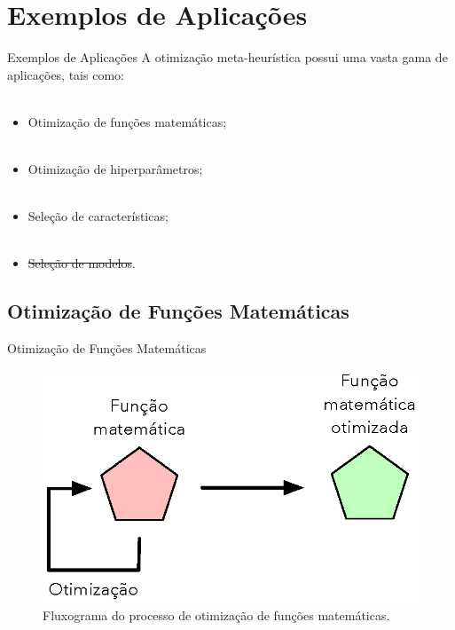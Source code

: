 \section{Exemplos de Aplicações}
\label{s.applications}

\begin{frame}{Exemplos de Aplicações}
	A otimização meta-heurística possui uma vasta gama de aplicações, tais como:
	\\~\\
	\begin{itemize}
		\justifying
		\item Otimização de funções matemáticas;
		\\~\\
		\item Otimização de hiperparâmetros;
		\\~\\
		\item Seleção de características;
		\\~\\
		\item \sout{Seleção de modelos}.
	\end{itemize}

\end{frame}

\subsection{Otimização de Funções Matemáticas}
\label{ss.applications_benchmark}

\begin{frame}{Otimização de Funções Matemáticas}
	\begin{figure}
		\centering
		\includegraphics[scale=0.375]{figs/benchmark_opt.eps}	
		\caption{Fluxograma do processo de otimização de funções matemáticas.}
		\label{f.benchmark_opt}
	\end{figure}
\end{frame}

